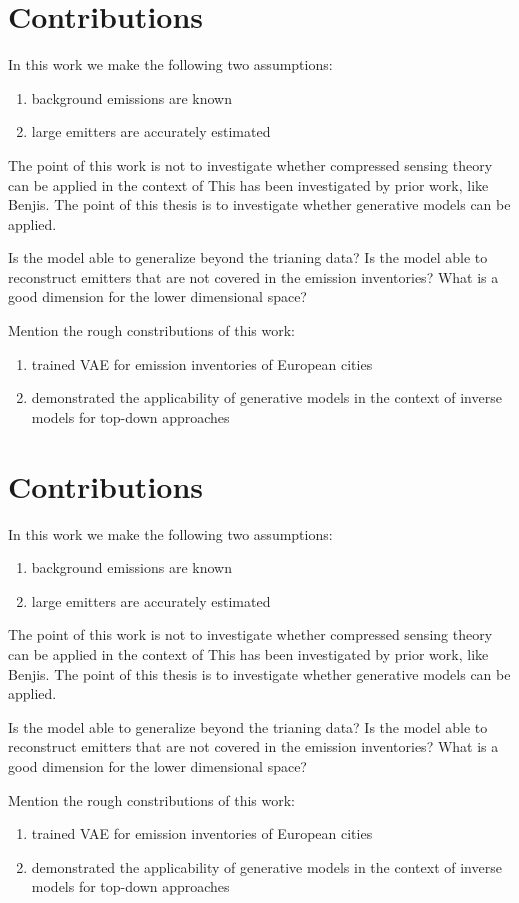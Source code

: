 \section{Contributions}
In this work we make the following two assumptions:
\begin{enumerate}
    \item background emissions are known
    \item large emitters are accurately estimated
\end{enumerate}

The point of this work is not to investigate whether compressed sensing theory can be applied in the context of 
This has been investigated by prior work, like Benjis.
The point of this thesis is to investigate whether generative models can be applied.

Is the model able to generalize beyond the trianing data?
Is the model able to reconstruct emitters that are not covered in the emission inventories? 
What is a good dimension for the lower dimensional space?

Mention the rough constributions of this work:
\begin{enumerate}
    \item trained VAE for emission inventories of European cities
    \item demonstrated the applicability of generative models in the context of inverse models for top-down approaches
\end{enumerate}


\section{Contributions}
In this work we make the following two assumptions:
\begin{enumerate}
    \item background emissions are known
    \item large emitters are accurately estimated
\end{enumerate}

The point of this work is not to investigate whether compressed sensing theory can be applied in the context of 
This has been investigated by prior work, like Benjis.
The point of this thesis is to investigate whether generative models can be applied.

Is the model able to generalize beyond the trianing data?
Is the model able to reconstruct emitters that are not covered in the emission inventories? 
What is a good dimension for the lower dimensional space?

Mention the rough constributions of this work:
\begin{enumerate}
    \item trained VAE for emission inventories of European cities
    \item demonstrated the applicability of generative models in the context of inverse models for top-down approaches
\end{enumerate}

